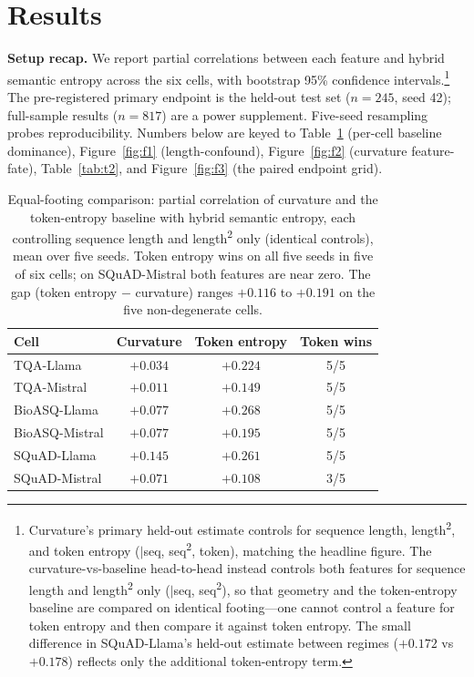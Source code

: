 \documentclass[11pt]{article}
\begin{document}
\section{Results}
\textbf{Setup recap.} We report partial correlations between each feature and hybrid semantic entropy across the six cells, with bootstrap 95\% confidence intervals.\footnote{Curvature's primary held-out estimate controls for sequence length, length\textsuperscript{2}, and token entropy ($|$seq, seq\textsuperscript{2}, token), matching the headline figure. The curvature-vs-baseline head-to-head instead controls both features for sequence length and length\textsuperscript{2} only ($|$seq, seq\textsuperscript{2}), so that geometry and the token-entropy baseline are compared on identical footing---one cannot control a feature for token entropy and then compare it against token entropy. The small difference in SQuAD-Llama's held-out estimate between regimes ($+0.172$ vs $+0.178$) reflects only the additional token-entropy term.} The pre-registered primary endpoint is the held-out test set ($n=245$, seed 42); full-sample results ($n=817$) are a power supplement. Five-seed resampling probes reproducibility. Numbers below are keyed to Table~\ref{tab:t1} (per-cell baseline dominance), Figure~\ref{fig:f1} (length-confound), Figure~\ref{fig:f2} (curvature feature-fate), Table~\ref{tab:t2}, and Figure~\ref{fig:f3} (the paired endpoint grid).
\begin{table}[t]
\centering
\caption{Equal-footing comparison: partial correlation of curvature and the token-entropy baseline with hybrid semantic entropy, each controlling sequence length and length\textsuperscript{2} only (identical controls), mean over five seeds. Token entropy wins on all five seeds in five of six cells; on SQuAD-Mistral both features are near zero. The gap (token entropy $-$ curvature) ranges $+0.116$ to $+0.191$ on the five non-degenerate cells.}
\label{tab:t1}
\begin{tabular}{lccc}
\toprule
Cell & Curvature & Token entropy & Token wins \\
\midrule
TQA-Llama & $+0.034$ & $+0.224$ & 5/5 \\
TQA-Mistral & $+0.011$ & $+0.149$ & 5/5 \\
BioASQ-Llama & $+0.077$ & $+0.268$ & 5/5 \\
BioASQ-Mistral & $+0.077$ & $+0.195$ & 5/5 \\
SQuAD-Llama & $+0.145$ & $+0.261$ & 5/5 \\
SQuAD-Mistral & $+0.071$ & $+0.108$ & 3/5 \\
\bottomrule
\end{tabular}
\end{table}
\end{document}
